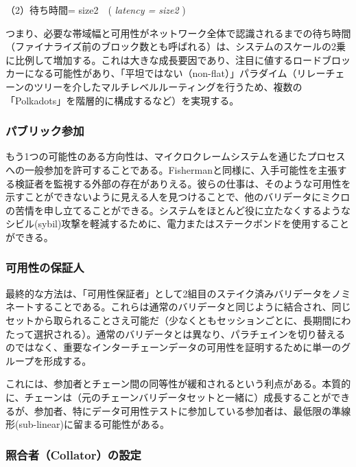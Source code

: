 （2）待ち時間= size2　( \emph{latency = size2} )

つまり、必要な帯域幅と可用性がネットワーク全体で認識されるまでの待ち時間（ファイナライズ前のブロック数とも呼ばれる）は、システムのスケールの2乗に比例して増加する。これは大きな成長要因であり、注目に値するロードブロッカーになる可能性があり、「平坦ではない（non-flat）」パラダイム（リレーチェーンのツリーを介したマルチレベルルーティングを行うため、複数の「Polkadots」を階層的に構成するなど）を実現する。

\hypertarget{ux30d1ux30d6ux30eaux30c3ux30afux53c2ux52a0}{%
\subsubsection{パブリック参加}\label{ux30d1ux30d6ux30eaux30c3ux30afux53c2ux52a0}}

もう1つの可能性のある方向性は、マイクロクレームシステムを通じたプロセスへの一般参加を許可することである。Fishermanと同様に、入手可能性を主張する検証者を監視する外部の存在がありえる。彼らの仕事は、そのような可用性を示すことができないように見える人を見つけることで、他のバリデータにミクロの苦情を申し立てることができる。システムをほとんど役に立たなくするようなシビル(sybil)攻撃を軽減するために、電力またはステークボンドを使用することができる。

\hypertarget{ux53efux7528ux6027ux306eux4fddux8a3cux4eba}{%
\subsubsection{可用性の保証人}\label{ux53efux7528ux6027ux306eux4fddux8a3cux4eba}}

最終的な方法は、「可用性保証者」として2組目のステイク済みバリデータをノミネートすることである。これらは通常のバリデータと同じように結合され、同じセットから取られることさえ可能だ（少なくともセッションごとに、長期間にわたって選択される）。通常のバリデータとは異なり、パラチェインを切り替えるのではなく、重要なインターチェーンデータの可用性を証明するために単一のグループを形成する。

これには、参加者とチェーン間の同等性が緩和されるという利点がある。本質的に、チェーンは（元のチェーンバリデータセットと一緒に）成長することができるが、参加者、特にデータ可用性テストに参加している参加者は、最低限の準線形(sub-linear)に留まる可能性がある。

\hypertarget{ux7167ux5408ux8005collatorux306eux8a2dux5b9a}{%
\subsubsection{照合者（Collat​​or）の設定}\label{ux7167ux5408ux8005collatorux306eux8a2dux5b9a}}

